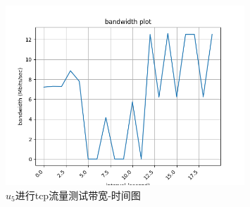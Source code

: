 \begin{figure}[h]
	\centering
	\includegraphics[width=0.8\textwidth]{image/u5.tcp.png}
	\caption{$u_5$进行tcp流量测试带宽-时间图}
 	\label{fig:topo3}
\end{figure}